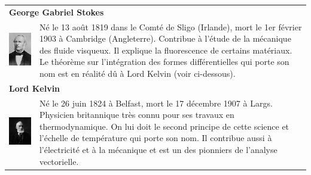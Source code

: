\vskip 12pt
\begin{tabular}{ll}
\multicolumn{2}{l}{\textbf{George Gabriel Stokes}} \\[10pt]
\begin{minipage}{0.2\linewidth}
\includegraphics[scale=0.3]{images/Stokes.jpg}
\end{minipage}
&
\begin{minipage}{0.65\linewidth}
Né le  	13 août 1819 dans le Comté de Sligo (Irlande), mort le 1er février 1903 à Cambridge (Angleterre). Contribue à l'étude de la mécanique des fluide visqueux. Il explique la fluorescence de certains matériaux. Le théorème sur l'intégration des formes différentielles qui porte son nom est en réalité dû à Lord Kelvin (voir ci-dessous).
\end{minipage}\\
\multicolumn{2}{l}{\textbf{Lord Kelvin}} \\[10pt]
\begin{minipage}{0.2\linewidth}
\includegraphics[scale=0.4]{images/Kelvin.jpg}
\end{minipage}
&
\begin{minipage}{0.65\linewidth}
Né le 26 juin 1824 à Belfast, mort le 17 décembre 1907 à
Largs. Physicien britannique très connu pour ses travaux en thermodynamique. On lui doit le second principe de cette science et l'échelle de température qui porte son nom. Il contribue aussi à l'électricité et à la mécanique et est un des pionniers de l'analyse vectorielle.  
\end{minipage}
\end{tabular}